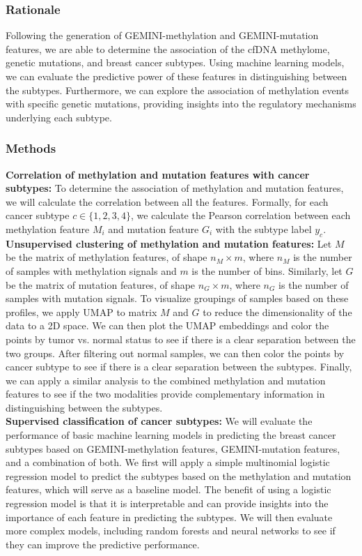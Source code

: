 \documentclass[11pt]{article}
\begin{document}
\subsubsection*{Rationale}
Following the generation of GEMINI-methylation and GEMINI-mutation features,
we are able to determine the association of the cfDNA methylome, genetic mutations,
and breast cancer subtypes. Using machine learning models, we can evaluate the 
predictive power of these features in distinguishing between the subtypes.
Furthermore, we can explore the association of methylation events with specific
genetic mutations, providing insights into the regulatory mechanisms underlying
each subtype.
\subsubsection*{Methods}
\textbf{Correlation of methylation and mutation features with cancer subtypes:}
To determine the association of methylation and mutation features, 
we will calculate the correlation between all the features. Formally, for each
cancer subtype $c \in \{1, 2, 3, 4\}$, we calculate the Pearson correlation
between each methylation feature $M_{i}$ and mutation feature $G_{i}$ with the
subtype label $y_{c}$. 
\medskip \\
\textbf{Unsupervised clustering of methylation and mutation features:}
Let $M$ be the matrix of methylation features, of shape $n_M \times m$, where $n_M$ is the number of samples with methylation signals and $m$ is the number of bins.
Similarly, let $G$ be the matrix of mutation features, of shape $n_G \times m$, where $n_G$ is the number of samples with mutation signals. 
To visualize groupings of samples based on these profiles,
we apply UMAP to matrix $M$ and $G$ to reduce the dimensionality of the data to a 2D space.
We can then plot the UMAP embeddings and color the points by tumor vs. normal status
to see if there is a clear separation between the two groups.
After filtering out normal samples, we can then color the points by cancer subtype to see if there is a clear separation between the subtypes.
Finally, we can apply a similar analysis to the combined methylation and mutation features to see if the two modalities provide complementary information in distinguishing between the subtypes.
\medskip \\
\textbf{Supervised classification of cancer subtypes:}
We will evaluate the performance of basic machine learning models in predicting the 
breast cancer subtypes based on GEMINI-methylation features, GEMINI-mutation features, and a combination of both. 
We first will apply a simple multinomial logistic regression model to predict the subtypes based on the methylation and mutation features, which will serve as a baseline model.
The benefit of using a logistic regression model is that it is interpretable and can provide insights into the importance of each feature in predicting the subtypes.
We will then evaluate more complex models, including random forests and neural networks to see if they can improve the predictive performance.
\end{document}
